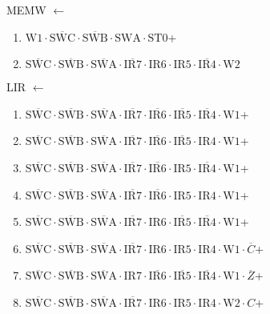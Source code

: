 \documentclass[UTF8]{ctexart}
\begin{document}
MEMW $\leftarrow$
\begin{enumerate}[\indent\indent]
	\item $\text{W1} \cdot \overline{\text{SWC}} \cdot \overline{\text{SWB}} \cdot \text{SWA} \cdot \text{ST0}$+
	\item $\overline{\text{SWC}} \cdot\overline{\text{SWB}}\cdot \overline{\text{SWA}} \cdot \overline{\text{IR7}} \cdot \text{IR6} \cdot \text{IR5} \cdot \overline{\text{IR4}} \cdot \text{W2}$
\end{enumerate}

LIR $\leftarrow$
\begin{enumerate}[\indent\indent]
	\item $\overline{\text{SWC}} \cdot\overline{\text{SWB}}\cdot \overline{\text{SWA}} \cdot \overline{\text{IR7}} \cdot \overline{\text{IR6}} \cdot \overline{\text{IR5}} \cdot \overline{\text{IR4}} \cdot \text{W1}$+
	\item $\overline{\text{SWC}} \cdot\overline{\text{SWB}}\cdot \overline{\text{SWA}} \cdot \overline{\text{IR7}} \cdot \overline{\text{IR6}} \cdot \overline{\text{IR5}} \cdot \text{IR4} \cdot \text{W1}$+
	\item $\overline{\text{SWC}} \cdot\overline{\text{SWB}}\cdot \overline{\text{SWA}} \cdot \overline{\text{IR7}} \cdot \overline{\text{IR6}} \cdot \text{IR5} \cdot \overline{\text{IR4}} \cdot \text{W1}$+
	\item $\overline{\text{SWC}} \cdot\overline{\text{SWB}}\cdot \overline{\text{SWA}} \cdot \overline{\text{IR7}} \cdot \overline{\text{IR6}} \cdot \text{IR5} \cdot \text{IR4} \cdot \text{W1}$+
	\item $\overline{\text{SWC}} \cdot\overline{\text{SWB}}\cdot \overline{\text{SWA}} \cdot \overline{\text{IR7}} \cdot \text{IR6} \cdot \overline{\text{IR5}} \cdot \overline{\text{IR4}} \cdot \text{W1}$+
	\item $\overline{\text{SWC}} \cdot\overline{\text{SWB}}\cdot \overline{\text{SWA}} \cdot \overline{\text{IR7}} \cdot \text{IR6} \cdot \text{IR5} \cdot \text{IR4} \cdot \text{W1} \cdot \overline{C}$+
	\item $\overline{\text{SWC}} \cdot\overline{\text{SWB}}\cdot \overline{\text{SWA}} \cdot \text{IR7} \cdot \overline{\text{IR6}} \cdot \overline{\text{IR5}} \cdot \overline{\text{IR4}} \cdot \text{W1} \cdot \overline{Z}$+
	\item $\overline{\text{SWC}} \cdot\overline{\text{SWB}}\cdot \overline{\text{SWA}} \cdot \overline{\text{IR7}} \cdot \text{IR6} \cdot \text{IR5} \cdot \text{IR4} \cdot \text{W2} \cdot C$+

\end{enumerate}
\end{document}
